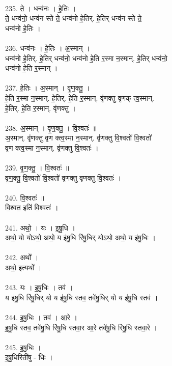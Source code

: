 \\
235. ते॒ । धन्व॑नः । हे॒तिः ।\\
ते॒ धन्व॑नो॒ धन्व॑न स्ते ते॒ धन्व॑नो हे॒तिर्. हे॒तिर् धन्व॑न स्ते ते॒\\
धन्व॑नो हे॒तिः ।\\
\\
236. धन्व॑नः । हे॒तिः । अ॒स्मान् ।\\
धन्व॑नो हे॒तिर्. हे॒तिर् धन्व॑नो॒ धन्व॑नो हे॒ति र॒स्मा न॒स्मान्. हे॒तिर् धन्व॑नो॒\\
धन्व॑नो हे॒ति र॒स्मान् ।\\
\\
237. हे॒तिः । अ॒स्मान् । वृ॒ण॒क्तु॒ ।\\
हे॒ति र॒स्मा न॒स्मान्. हे॒तिर्. हे॒ति र॒स्मान्. वृ॑णक्तु वृणक् त्व॒स्मान्.\\
हे॒तिर्. हे॒ति र॒स्मान्. वृ॑णक्तु ।\\
\\
238. अ॒स्मान् । वृ॒ण॒क्तु॒ । वि॒श्वतः॑ ॥\\
अ॒स्मान्. वृ॑णक्तु वृण क्त्व॒स्मा न॒स्मान्. वृ॑णक्तु वि॒श्वतो॑ वि॒श्वतो॑\\
वृण क्त्व॒स्मा न॒स्मान्. वृ॑णक्तु वि॒श्वतः॑ ।\\
\\
239. वृ॒ण॒क्तु॒ । वि॒श्वतः॑ ॥\\
वृ॒ण॒क्तु॒ वि॒श्वतो॑ वि॒श्वतो॑ वृणक्तु वृणक्तु वि॒श्वतः॑ ।\\
\\
240. वि॒श्वतः॑ ॥\\
वि॒श्वत॒ इति॑ वि॒श्वतः॑ ।\\
\\
241. अथो॒ । यः । इ॒षु॒धि ।\\
अथो॒ यो योऽथो॒ अथो॒ य इ॑षु॒धि रि॑षु॒धिर् योऽथो॒ अथो॒ य इ॑षु॒धिः ।\\
\\
242. अथो᳚ ।\\
अथो॒ इत्यथो᳚ ।\\
\\
243. यः । इ॒षु॒धिः । तव॑ ।\\
य इ॑षु॒धि रि॑षु॒धिर् यो य इ॑षु॒धि स्तव॒ तवे॑षु॒धिर् यो य इ॑षु॒धि स्तव॑ ।\\
\\
244. इ॒षु॒धिः । तव॑ । आ॒रे ।\\
इ॒षु॒धि स्तव॒ तवे॑षु॒धि रि॑षु॒धि स्तवा॒र आ॒रे तवे॑षु॒धि रि॑षु॒धि स्तवा॒रे ।\\
\\
245. इ॒षु॒धिः ।\\
इ॒षु॒धिरिती॑षु - धिः ।\\
